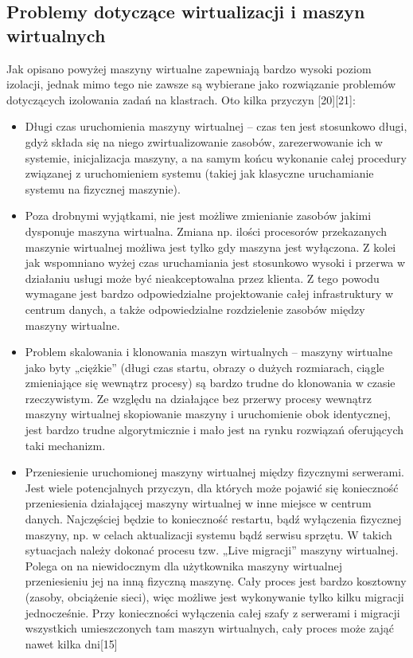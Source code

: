 \documentclass[10pt,a4paper,titlepage,twoside]{report}
\begin{document}
\subsection{Problemy dotyczące wirtualizacji i maszyn wirtualnych}\indent \indent Jak opisano powyżej maszyny wirtualne zapewniają bardzo wysoki poziom izolacji, jednak mimo tego nie zawsze są wybierane jako rozwiązanie problemów dotyczących izolowania zadań na klastrach. Oto kilka przyczyn [20][21]:
\begin{itemize}
	\item Długi czas uruchomienia maszyny wirtualnej – czas ten jest stosunkowo długi, gdyż składa się na niego zwirtualizowanie zasobów, zarezerwowanie ich w systemie, inicjalizacja maszyny, a na samym końcu wykonanie całej procedury związanej z uruchomieniem systemu (takiej jak klasyczne uruchamianie systemu na fizycznej maszynie).
	\item Poza drobnymi wyjątkami, nie jest możliwe zmienianie zasobów jakimi dysponuje maszyna wirtualna. Zmiana np. ilości procesorów przekazanych maszynie wirtualnej możliwa jest tylko gdy maszyna jest wyłączona. Z kolei jak wspomniano wyżej czas uruchamiania jest stosunkowo wysoki i przerwa w działaniu usługi może być nieakceptowalna przez klienta. Z tego powodu wymagane jest bardzo odpowiedzialne projektowanie całej infrastruktury w centrum danych, a także odpowiedzialne rozdzielenie zasobów między maszyny wirtualne.
	\item Problem skalowania i klonowania maszyn wirtualnych – maszyny wirtualne jako byty „ciężkie” (długi czas startu, obrazy o dużych rozmiarach, ciągle zmieniające się wewnątrz procesy) są bardzo trudne do klonowania w czasie rzeczywistym. Ze względu na działające bez przerwy procesy wewnątrz maszyny wirtualnej skopiowanie maszyny i uruchomienie obok identycznej, jest bardzo trudne algorytmicznie i mało jest na rynku rozwiązań oferujących taki mechanizm.
	\item Przeniesienie uruchomionej maszyny wirtualnej między fizycznymi serwerami. Jest wiele potencjalnych przyczyn, dla których może pojawić się konieczność przeniesienia działającej maszyny wirtualnej w inne miejsce w centrum danych. Najczęściej będzie to konieczność restartu, bądź wyłączenia fizycznej maszyny, np. w celach aktualizacji systemu bądź serwisu sprzętu. W takich sytuacjach należy dokonać procesu tzw. „Live migracji” maszyny wirtualnej. Polega on na niewidocznym dla użytkownika maszyny wirtualnej przeniesieniu jej na inną fizyczną maszynę. Cały proces jest bardzo kosztowny (zasoby, obciążenie sieci), więc możliwe jest wykonywanie tylko kilku migracji jednocześnie. Przy konieczności wyłączenia całej szafy z serwerami i migracji wszystkich umieszczonych tam maszyn wirtualnych, cały proces może zająć nawet kilka dni[15]
\end{itemize}
\end{document}
